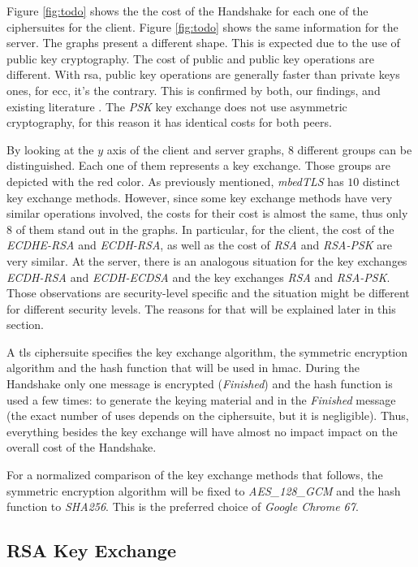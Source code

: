 \documentclass{llncs}
\begin{document}
Figure \ref{fig:todo} shows the the cost of the Handshake for each one of the ciphersuites for the client. Figure
\ref{fig:todo} shows the same information for the server. The graphs present a different shape. This is expected due 
to the use of public key cryptography. The cost of public and public key operations are different. With \gls{rsa},
public key operations are generally faster than private keys ones, for \gls{ecc}, it's the contrary. This is confirmed
by both, our findings, and existing literature \cite{maletsky2015rsa}. The \textit{PSK} key exchange does not
use asymmetric cryptography, for this reason it has identical costs for both peers.

By looking at the $y$ axis of the client and server graphs, $8$ different groups can be distinguished. Each one of them 
represents a key exchange. Those groups are depicted with the red color.  As previously mentioned, \textit{mbedTLS} has 
$10$ distinct key exchange methods. However, since some key exchange methods have very similar operations involved,
the costs for their cost is almost the same, thus only $8$ of them stand out in the graphs. In particular,
for the client, the cost of the \textit{ECDHE-RSA} and \textit{ECDH-RSA}, as well as the cost of \textit{RSA} and \textit{RSA-PSK}
are very similar. At the server, there is an analogous situation for the key exchanges \textit{ECDH-RSA} and \textit{ECDH-ECDSA}
and the key exchanges \textit{RSA} and \textit{RSA-PSK}. Those observations are security-level specific and the situation
might be different for different security levels. The reasons for that will be explained later in this section.

A \gls{tls} ciphersuite specifies the key exchange algorithm, the symmetric encryption algorithm and the hash function
that will be used in \gls{hmac}. During the Handshake only one message is encrypted (\textit{Finished}) and the hash function
is used a few times: to generate the keying material and in the \textit{Finished} message (the exact number of uses
depends on the ciphersuite, but it is negligible). Thus, everything besides the key exchange will have almost no impact
impact on the overall cost of the Handshake.

For a normalized comparison of the key exchange methods that follows, the symmetric encryption algorithm
will be fixed to \textit{AES\_128\_GCM} and the hash function to \textit{SHA256}. This is the preferred choice
of \textit{Google Chrome 67}.


\subsection{RSA Key Exchange}
\end{document}
